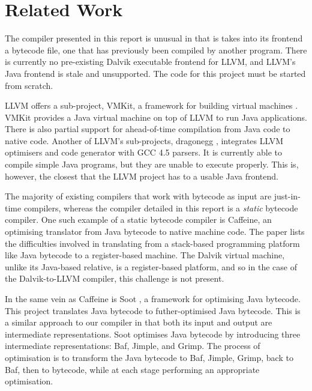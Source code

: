 \chapter{Related Work}
\label{chap:related}

The compiler presented in this report is unusual in that is takes into its frontend a bytecode file, one that has previously been compiled by another program. There is currently no pre-existing Dalvik executable frontend for LLVM, and LLVM's Java frontend is stale and unsupported\footnotemark {}. The code for this project must be started from scratch.

LLVM offers a sub-project, VMKit, a framework for building virtual machines \cite{geoffray10vmkit}. VMKit provides a Java virtual machine on top of LLVM to run Java applications. There is also partial support for ahead-of-time compilation from Java code to native code. Another of LLVM's sub-projects, dragonegg \cite{dragonegg}, integrates LLVM optimisers and code generator with GCC 4.5 parsers. It is currently able to compile simple Java programs, but they are unable to execute properly. This is, however, the closest that the LLVM project has to a usable Java frontend.

The majority of existing compilers that work with bytecode as input are just-in-time compilers, whereas the compiler detailed in this report is a \emph{static} bytecode compiler. One such example of a static bytecode compiler is Caffeine\cite{Hsieh:1996:JBN:243846.243864}, an optimising translator from Java bytecode to native machine code. The paper lists the difficulties involved in translating from a stack-based programming platform like Java bytecode to a register-based machine. The Dalvik virtual machine, unlike its Java-based relative, is a register-based platform, and so in the case of the Dalvik-to-LLVM compiler, this challenge is not present.

In the same vein as Caffeine is Soot \cite{Vallee-Rai:1999:SJB:781995.782008}, a framework for optimising Java bytecode. This project translates Java bytecode to futher-optimised Java bytecode. This is a similar approach to our compiler in that both its input and output are intermediate representations. Soot optimises Java bytecode by introducing three intermediate representations: Baf, Jimple, and Grimp. The process of optimisation is to transform the Java bytecode to Baf, Jimple, Grimp, back to Baf, then to bytecode, while at each stage performing an appropriate optimisation.

